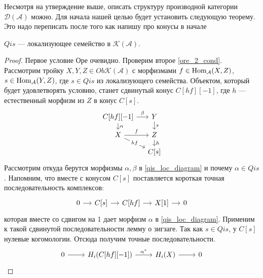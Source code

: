 \documentclass[../hw_main.tex]{subfiles}
\begin{document}
Несмотря на утверждение выше, описать структуру производной категории $\mathcal{D}(\mathcal{A})$ можно. Для начала нашей целью будет установить следующую теорему.
{\color{red} Это надо переписать после того как напишу про конусы в начале}
\begin{to_thr}
$Qis$ --- локализующее семейство в $\mathcal{K}(\mathcal{A})$.
\end{to_thr}
\begin{proof}
Первое условие Оре очевидно. Проверим второе \eqref{ore_2_cond}.
Рассмотрим тройку $X, Y, Z\in Ob\mathcal{K}(\mathcal{A})$ с морфизмами $f\in \operatorname{Hom}_\mathcal{A}(X, Z)$, $s\in \operatorname{Hom}_\mathcal{A}(Y, Z)$, где $s\in Qis$ из локализующего семейства. Объектом, который будет удовлетворять условию, станет сдвинутый конус $C[hf][-1]$, где $h$ --- естественный морфизм из $Z$ в конус $C[s]$.
    \begin{equation}\label{qis_loc_diagram}
        \begin{tikzcd}[sep=small]
	{C[hf][-1]} & Y \\
	X & {Z} \\
	& {C[s]}
	\arrow["s", from=1-2, to=2-2]
	\arrow["f", from=2-1, to=2-2]
	\arrow["h", from=2-2, to=3-2]
	\arrow["hf"{description}, from=2-1, to=3-2]
	\arrow["\alpha", from=1-1, to=2-1]
	\arrow["\beta", from=1-1, to=1-2]
\end{tikzcd}
\end{equation}
Рассмотрим откуда берутся морфизмы $\alpha, \beta$ в \eqref{qis_loc_diagram} и почему $\alpha \in Qis$.
Напомним, что вместе с конусом $C[s]$ поставляется короткая точная последовательность комплексов:
\begin{equation*}
        \begin{tikzcd}[sep=small]
	0&C[s] & {C[hf]} & {X[1]}&0
	\arrow[from=1-2, to=1-3]
	\arrow[from=1-3, to=1-4]
 \arrow[from=1-1, to=1-2]
 \arrow[from=1-4, to=1-5]
\end{tikzcd}
    \end{equation*}
    которая вместе со сдвигом на 1 дает морфизм $\alpha$ в \eqref{qis_loc_diagram}. Применим к такой сдвинутой последовательности лемму о зигзаге. Так как $s\in Qis$, у $C[s]$ нулевые когомологии. Отсюда получим точные последовательности.
    \begin{equation}\label{32_snake_lemma}
        \begin{tikzcd}
	0 & {H_i(C[hf][-1])} & {H_i(X)} & 0
	\arrow[from=1-1, to=1-2]
	\arrow["{\alpha^*}", from=1-2, to=1-3]
	\arrow[from=1-3, to=1-4]
\end{tikzcd}
    \end{equation}

\end{proof}
\end{document}
